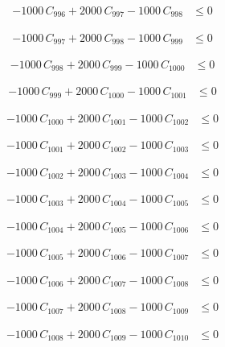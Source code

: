 \documentclass[a4paper,11pt]{article}
\begin{document}
\begin{align}
-1000\,C_{996} + 2000\,C_{997} - 1000\,C_{998} &\leq 0 \nonumber
\end{align}

\begin{align}
-1000\,C_{997} + 2000\,C_{998} - 1000\,C_{999} &\leq 0 \nonumber
\end{align}

\begin{align}
-1000\,C_{998} + 2000\,C_{999} - 1000\,C_{1000} &\leq 0 \nonumber
\end{align}

\begin{align}
-1000\,C_{999} + 2000\,C_{1000} - 1000\,C_{1001} &\leq 0 \nonumber
\end{align}

\begin{align}
-1000\,C_{1000} + 2000\,C_{1001} - 1000\,C_{1002} &\leq 0 \nonumber
\end{align}

\begin{align}
-1000\,C_{1001} + 2000\,C_{1002} - 1000\,C_{1003} &\leq 0 \nonumber
\end{align}

\begin{align}
-1000\,C_{1002} + 2000\,C_{1003} - 1000\,C_{1004} &\leq 0 \nonumber
\end{align}

\begin{align}
-1000\,C_{1003} + 2000\,C_{1004} - 1000\,C_{1005} &\leq 0 \nonumber
\end{align}

\begin{align}
-1000\,C_{1004} + 2000\,C_{1005} - 1000\,C_{1006} &\leq 0 \nonumber
\end{align}

\begin{align}
-1000\,C_{1005} + 2000\,C_{1006} - 1000\,C_{1007} &\leq 0 \nonumber
\end{align}

\begin{align}
-1000\,C_{1006} + 2000\,C_{1007} - 1000\,C_{1008} &\leq 0 \nonumber
\end{align}

\begin{align}
-1000\,C_{1007} + 2000\,C_{1008} - 1000\,C_{1009} &\leq 0 \nonumber
\end{align}

\begin{align}
-1000\,C_{1008} + 2000\,C_{1009} - 1000\,C_{1010} &\leq 0 \nonumber
\end{align}
\end{document}
